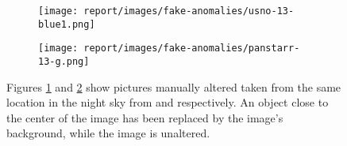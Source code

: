 \begin{figure}[H]
    \centering
    \begin{subfigure}{.5\textwidth}
      \centering
      \texttt{[image: report/images/fake-anomalies/usno-13-blue1.png]}
      \caption{\usno}
      \label{fig:a:fake:usno-13-blue1}
    \end{subfigure}%
    \begin{subfigure}{.5\textwidth}
      \centering
      \texttt{[image: report/images/fake-anomalies/panstarr-13-g.png]}
      \caption{\panstarrs}
      \label{fig:b:fake:panstarr-13-g}
    \end{subfigure}
    \caption{Figures \ref{fig:a:fake:usno-13-blue1} and \ref{fig:b:fake:panstarr-13-g} show pictures manually altered taken from the same location in the night sky from \usno and \panstarrs respectively. An object close to the center of the \panstarrs image has been replaced by the image's background, while the \usno image is unaltered.}
    \label{fig:fake:mission-13}
\end{figure}

